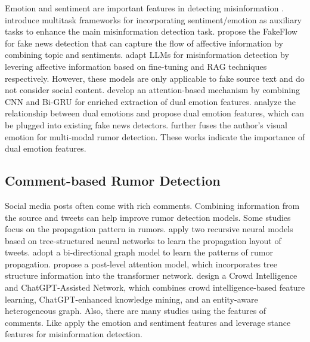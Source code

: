 Emotion and sentiment are important features in detecting misinformation \cite{liu2024emotion}. 
\citet{choudhry2022emotion,chakraborty2023emotion,jiang2024makes,kumari2024emotion} introduce multitask frameworks for incorporating sentiment/emotion as auxiliary tasks to enhance the main misinformation detection task. \citet{ghanem2021fakeflow} propose the FakeFlow for fake news detection that can capture the flow of affective information by combining topic and sentiments. \citet{Liu2024ConspEmoLLMCT,liu2024raemollm} adapt LLMs for misinformation detection by levering affective information based on fine-tuning and RAG techniques respectively. However, these models are only applicable to fake source text and do not consider social content. \citet{luvembe2023dual} develop an attention-based mechanism by combining CNN and Bi-GRU for enriched extraction of dual emotion features. \citet{zhang2021mining} analyze the relationship between dual emotions and propose dual emotion features, which can be plugged into existing fake news detectors. \citet{wang2024multimodal} further fuses the author's visual emotion for multi-modal rumor detection. These works indicate the importance of dual emotion features. 

\subsection{Comment-based Rumor Detection}

Social media posts often come with rich comments. Combining information from the source and tweets can help improve rumor detection models. Some studies focus on the propagation pattern in rumors. \citet{ma-etal-2018-rumor} apply two recursive neural models based on tree-structured neural networks to learn the propagation layout of tweets. \citet{bian2020rumor} adopt a bi-directional graph model to learn the patterns of rumor propagation. \citet{khoo2020interpretable} propose a post-level attention model, which incorporates tree structure information into the transformer network.  \cite{yang-etal-2023-rumor} design a Crowd Intelligence and ChatGPT-Assisted Network, which combines crowd intelligence-based feature learning, ChatGPT-enhanced knowledge mining, and an entity-aware heterogeneous graph. Also, there are many studies using the features of comments. Like \citet{zhang2021mining} apply the emotion and sentiment features and \citet{enayet2017niletmrg,li2021joint} leverage stance features for misinformation detection.

